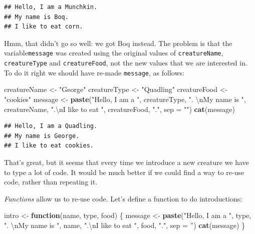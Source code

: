 \documentclass[]{book}
\makeatletter
\newenvironment{Shaded}{\begin{snugshade}}{\end{snugshade}}
\newcommand{\KeywordTok}[1]{\textcolor[rgb]{0.13,0.29,0.53}{\textbf{#1}}}
\newcommand{\DataTypeTok}[1]{\textcolor[rgb]{0.13,0.29,0.53}{#1}}
\newcommand{\CharTok}[1]{\textcolor[rgb]{0.31,0.60,0.02}{#1}}
\newcommand{\StringTok}[1]{\textcolor[rgb]{0.31,0.60,0.02}{#1}}
\newcommand{\ControlFlowTok}[1]{\textcolor[rgb]{0.13,0.29,0.53}{\textbf{#1}}}
\newcommand{\NormalTok}[1]{#1}
\newenvironment{kframe}{%
\medskip{}
\setlength{\fboxsep}{.8em}
 \def\at@end@of@kframe{}%
 \ifinner\ifhmode%
  \def\at@end@of@kframe{\end{minipage}}%
  \begin{minipage}{\columnwidth}%
 \fi\fi%
 \def\FrameCommand##1{\hskip\@totalleftmargin \hskip-\fboxsep
 \colorbox{shadecolor}{##1}\hskip-\fboxsep
     \hskip-\linewidth \hskip-\@totalleftmargin \hskip\columnwidth}%
 \MakeFramed {\advance\hsize-\width
   \@totalleftmargin\z@ \linewidth\hsize
   \@setminipage}}%
 {\par\unskip\endMakeFramed%
 \at@end@of@kframe}
\renewenvironment{Shaded}{\begin{kframe}}{\end{kframe}}
\theoremstyle{definition}
\theoremstyle{definition}
\theoremstyle{definition}
\theoremstyle{remark}
\makeatother
\begin{document}
\begin{verbatim}
## Hello, I am a Munchkin.
## My name is Boq.
## I like to eat corn.
\end{verbatim}

Hmm, that didn't go so well: we got Boq instead. The problem is that the
variable\texttt{message} was created using the original values of
\texttt{creatureName}, \texttt{creatureType} and \texttt{creatureFood},
not the new values that we are interested in. To do it right we should
have re-made \texttt{message}, as follows:

\begin{Shaded}
\begin{Highlighting}[]
\NormalTok{creatureName <-}\StringTok{ "George"}
\NormalTok{creatureType <-}\StringTok{ "Quadling"}
\NormalTok{creatureFood <-}\StringTok{ "cookies"}
\NormalTok{message <-}\StringTok{ }\KeywordTok{paste}\NormalTok{(}\StringTok{"Hello, I am a "}\NormalTok{,}
\NormalTok{                 creatureType,}
                 \StringTok{".  }\CharTok{\textbackslash{}n}\StringTok{My name is "}\NormalTok{,}
\NormalTok{                 creatureName,}
                 \StringTok{".}\CharTok{\textbackslash{}n}\StringTok{I like to eat "}\NormalTok{,}
\NormalTok{                 creatureFood,}
                 \StringTok{"."}\NormalTok{,}
                 \DataTypeTok{sep =} \StringTok{""}\NormalTok{)}
\KeywordTok{cat}\NormalTok{(message)}
\end{Highlighting}
\end{Shaded}

\begin{verbatim}
## Hello, I am a Quadling.  
## My name is George.
## I like to eat cookies.
\end{verbatim}

That's great, but it seems that every time we introduce a new creature
we have to type a lot of code. It would be much better if we could find
a way to re-use code, rather than repeating it.

\emph{Functions} allow us to re-use code. Let's define a function to do
introductions:

\begin{Shaded}
\begin{Highlighting}[]
\NormalTok{intro <-}\StringTok{ }\ControlFlowTok{function}\NormalTok{(name, type, food) \{}
\NormalTok{  message <-}\StringTok{ }\KeywordTok{paste}\NormalTok{(}\StringTok{"Hello, I am a "}\NormalTok{,}
\NormalTok{                 type,}
                 \StringTok{".  }\CharTok{\textbackslash{}n}\StringTok{My name is "}\NormalTok{,}
\NormalTok{                 name,}
                 \StringTok{".}\CharTok{\textbackslash{}n}\StringTok{I like to eat "}\NormalTok{,}
\NormalTok{                 food,}
                 \StringTok{"."}\NormalTok{,}
                 \DataTypeTok{sep =} \StringTok{''}\NormalTok{)}
  \KeywordTok{cat}\NormalTok{(message)}
\NormalTok{\}}
\end{Highlighting}
\end{Shaded}
\end{document}
